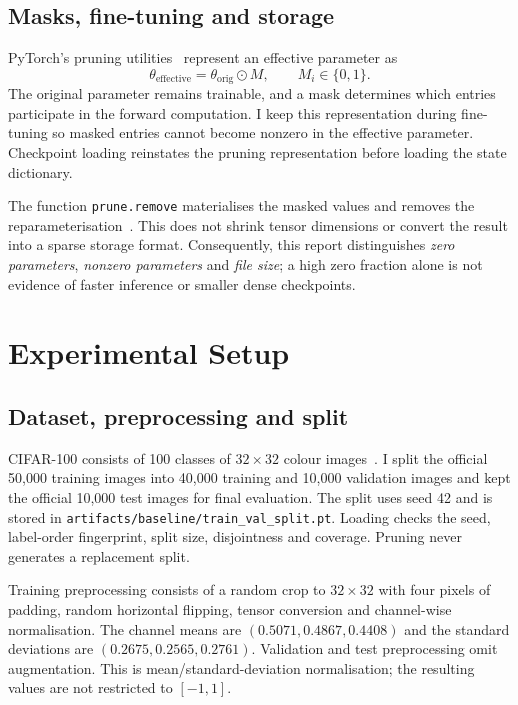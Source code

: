 \documentclass[11pt,a4paper]{article}
\newcommand{\code}[1]{\texttt{#1}}
\begin{document}
\subsection{Masks, fine-tuning and storage}

PyTorch's pruning utilities~\cite{pytorchpruning} represent an effective parameter as
\begin{equation}
 \theta_{\mathrm{effective}}=\theta_{\mathrm{orig}}\odot M,
 \qquad M_i\in\{0,1\}.
\end{equation}
The original parameter remains trainable, and a mask determines which entries participate in the forward computation. I keep this representation during fine-tuning so masked entries cannot become nonzero in the effective parameter. Checkpoint loading reinstates the pruning representation before loading the state dictionary.

The function \code{prune.remove} materialises the masked values and removes the reparameterisation~\cite{pytorchremove}. This does not shrink tensor dimensions or convert the result into a sparse storage format. Consequently, this report distinguishes \emph{zero parameters}, \emph{nonzero parameters} and \emph{file size}; a high zero fraction alone is not evidence of faster inference or smaller dense checkpoints.

\section{Experimental Setup}

\subsection{Dataset, preprocessing and split}

CIFAR-100 consists of 100 classes of $32\times32$ colour images~\cite{cifar100}. I split the official 50,000 training images into 40,000 training and 10,000 validation images and kept the official 10,000 test images for final evaluation. The split uses seed 42 and is stored in \code{artifacts/baseline/train\_val\_split.pt}. Loading checks the seed, label-order fingerprint, split size, disjointness and coverage. Pruning never generates a replacement split.

Training preprocessing consists of a random crop to $32\times32$ with four pixels of padding, random horizontal flipping, tensor conversion and channel-wise normalisation. The channel means are $(0.5071,0.4867,0.4408)$ and the standard deviations are $(0.2675,0.2565,0.2761)$. Validation and test preprocessing omit augmentation. This is mean/standard-deviation normalisation; the resulting values are not restricted to $[-1,1]$.
\end{document}
